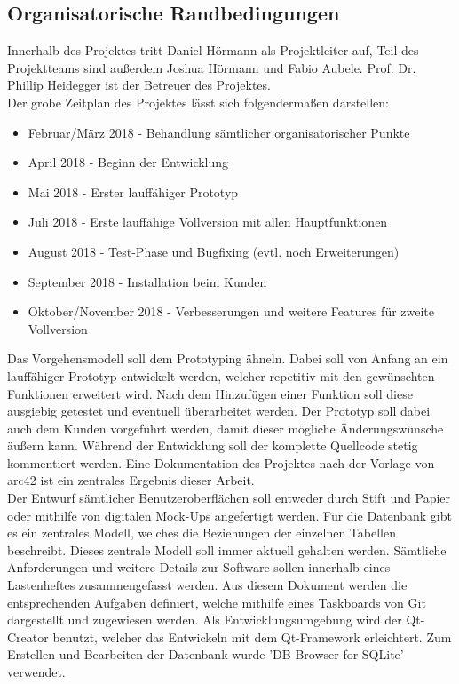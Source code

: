 \subsection{Organisatorische Randbedingungen}
Innerhalb des Projektes tritt Daniel Hörmann als Projektleiter auf, Teil des Projektteams sind außerdem Joshua Hörmann und Fabio Aubele. Prof. Dr. Phillip Heidegger ist der Betreuer des Projektes.\\
Der grobe Zeitplan des Projektes lässt sich folgendermaßen darstellen:
\begin{itemize}
	\item Februar/März 2018 - Behandlung sämtlicher organisatorischer Punkte
	\item April 2018 - Beginn der Entwicklung
	\item Mai 2018 - Erster lauffähiger Prototyp
	\item Juli 2018 - Erste lauffähige Vollversion mit allen Hauptfunktionen
	\item August 2018 - Test-Phase und Bugfixing (evtl. noch Erweiterungen)
	\item September 2018 - Installation beim Kunden
	\item Oktober/November 2018 - Verbesserungen und weitere Features für zweite Vollversion
\end{itemize}
Das Vorgehensmodell soll dem Prototyping ähneln. Dabei soll von Anfang an ein lauffähiger Prototyp entwickelt werden, welcher repetitiv mit den gewünschten Funktionen erweitert wird. Nach dem Hinzufügen einer Funktion soll diese ausgiebig getestet und eventuell überarbeitet werden. Der Prototyp soll dabei auch dem Kunden vorgeführt werden, damit dieser mögliche Änderungswünsche äußern kann. Während der Entwicklung soll der komplette Quellcode stetig kommentiert werden. Eine Dokumentation des Projektes nach der Vorlage von arc42 \cite{arc42} ist ein zentrales Ergebnis dieser Arbeit.  \\
Der Entwurf sämtlicher Benutzeroberflächen soll entweder durch Stift und Papier oder mithilfe von digitalen Mock-Ups angefertigt werden. Für die Datenbank gibt es ein zentrales Modell, welches die Beziehungen der einzelnen Tabellen beschreibt. Dieses zentrale Modell soll immer aktuell gehalten werden. Sämtliche Anforderungen und weitere Details zur Software sollen innerhalb eines Lastenheftes zusammengefasst werden. Aus diesem Dokument werden die entsprechenden Aufgaben definiert, welche mithilfe eines Taskboards von Git dargestellt und zugewiesen werden. Als Entwicklungsumgebung wird der Qt-Creator benutzt, welcher das Entwickeln mit dem Qt-Framework erleichtert. Zum Erstellen und Bearbeiten der Datenbank wurde 'DB Browser for SQLite' verwendet.\\
